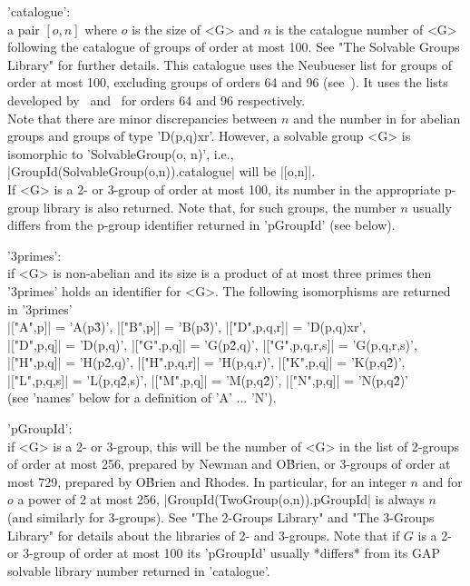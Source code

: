'catalogue': \\
    a pair $[o,n]$ where $o$ is the size of <G> and  $n$ is the catalogue
    number of <G> following  the catalogue of groups of order at most 100.
    See   "The  Solvable  Groups Library"  for   further  details.   This
    catalogue  uses the Neubueser  list  for groups of  order at most 100,
    excluding groups of orders 64 and 96 (see~\cite{Neu67}).  It uses the
    lists developed by~\cite{HS64} and~\cite{Lau82} for  orders 64 and 96
    respectively.\medskip\\
%
    Note that there are minor discrepancies between $n$ and the number in
    \cite{Neu67}  for   abelian groups and   groups   of type 'D(p,q)xr'.
    However, a solvable group <G> is isomorphic to 'SolvableGroup(o, n)',
    i.e.,   |GroupId(SolvableGroup(o,n)).catalogue|        will        be
    |[o,n]|.\medskip\\
%
    If  <G> is a 2-  or 3-group of  order at most 100,  its number in the
    appropriate  p-group library is  also  returned.  Note that, for such
    groups, the number $n$  usually  differs from the p-group  identifier
    returned in 'pGroupId' (see below).

'3primes': \\
    if <G> is  non-abelian and its  size  is a  product of at  most three
    primes then '3primes' holds    an identifier for <G>.  The  following
    isomorphisms are returned in '3primes'\:\\
        |["A",p]| = 'A(p\^3)',	      |["B",p]| = 'B(p\^3)',
        |["D",p,q,r]| = 'D(p,q)xr', \\|["D",p,q]| = 'D(p,q)',
        |["G",p,q]| = 'G(p\^2,q)',    |["G",p,q,r,s]| = 'G(p,q,r,s)',\\
        |["H",p,q]| = 'H(p\^2,q)',    |["H",p,q,r]| = 'H(p,q,r)',
        |["K",p,q]| = 'K(p,q\^2)',  \\|["L",p,q,s]| = 'L(p,q\^2,s)',
        |["M",p,q]| = 'M(p,q\^2)',    |["N",p,q]| = 'N(p,q\^2)'\\
    (see 'names' below for a definition of 'A' ... 'N').

'pGroupId': \\
    if <G> is a 2- or 3-group, this will be the number of <G> in the list
    of 2-groups of order at most 256, prepared by Newman and O\'Brien, or
    3-groups of order at most  729, prepared by  O\'Brien and Rhodes.  In
    particular, for an integer $n$ and for $o$ a power of  2 at most 256,
    |GroupId(TwoGroup(o,n)).pGroupId|  is always  $n$ (and similarly  for
    3-groups).  See "The 2-Groups Library" and "The 3-Groups Library" for
    details about the libraries of 2- and 3-groups.  Note  that if $G$ is
    a 2- or 3-group of order at most 100 its 'pGroupId' usually *differs*
    from its GAP solvable library number returned in 'catalogue'.

